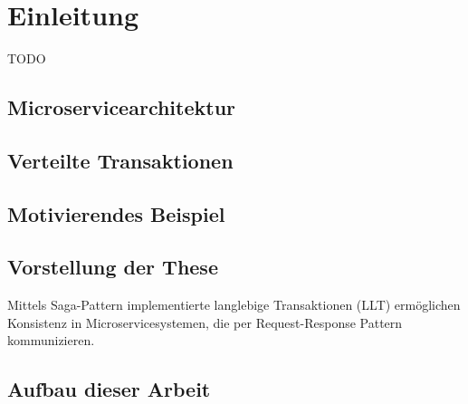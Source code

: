 \chapter{Einleitung}
TODO
\section{Microservicearchitektur}

\section{Verteilte Transaktionen}

\section{Motivierendes Beispiel}

\section{Vorstellung der These}

Mittels Saga-Pattern implementierte langlebige Transaktionen (LLT) ermöglichen Konsistenz in Microservicesystemen, die per Request-Response Pattern kommunizieren. 


\section{Aufbau dieser Arbeit}













